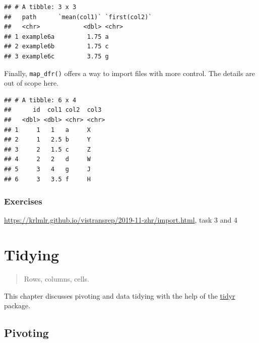 \documentclass[]{book}
\newenvironment{Shaded}{}{}
\newcommand{\KeywordTok}[1]{\textcolor[rgb]{0.00,0.00,1.00}{#1}}
\newcommand{\NormalTok}[1]{#1}
\newcommand{\OperatorTok}[1]{#1}
\newcommand{\StringTok}[1]{\textcolor[rgb]{0.00,0.50,0.50}{#1}}
\begin{document}
\begin{verbatim}
## # A tibble: 3 x 3
##   path      `mean(col1)` `first(col2)`
##   <chr>            <dbl> <chr>        
## 1 example6a         1.75 a            
## 2 example6b         1.75 c            
## 3 example6c         3.75 g
\end{verbatim}

Finally, \texttt{map\_dfr()} offers a way to import files with more control.
The details are out of scope here.

\begin{Shaded}
\end{Shaded}

\begin{verbatim}
## # A tibble: 6 x 4
##      id  col1 col2  col3 
##   <dbl> <dbl> <chr> <chr>
## 1     1   1   a     X    
## 2     1   2.5 b     Y    
## 3     2   1.5 c     Z    
## 4     2   2   d     W    
## 5     3   4   g     J    
## 6     3   3.5 f     H
\end{verbatim}

\hypertarget{exercises-7}{%
\subsection*{Exercises}\label{exercises-7}}

\url{https://krlmlr.github.io/vistransrep/2019-11-zhr/import.html}, task 3 and 4

\hypertarget{tidying}{%
\chapter{Tidying}\label{tidying}}

\begin{quote}
Rows, columns, cells.
\end{quote}

This chapter discusses pivoting and data tidying with the help of the \href{https://tidyr.tidyverse.org/}{tidyr} package.

\hypertarget{pivoting}{%
\section{Pivoting}\label{pivoting}}
\end{document}

